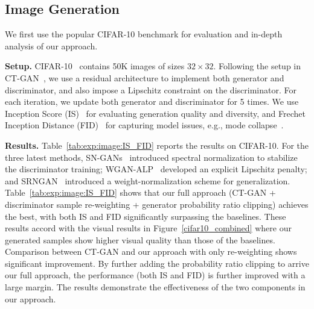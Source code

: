 \documentclass{article}
\newcommand{\0}{\bm{0}}
\begin{document}
\subsection{Image Generation}\label{sec:exp:image}
We first use the popular CIFAR-10 benchmark for evaluation and in-depth analysis of our approach.






\textbf{Setup.}  
CIFAR-10~\cite{cifar10} contains 50K images of sizes $32\times 32$. Following the setup in CT-GAN~\cite{wwgan}, 
we use a residual architecture to implement both generator and discriminator, and also impose a Lipschitz constraint on the discriminator. For each iteration, we update both generator and discriminator for 5 times. We use Inception Score (IS)~\cite{salimans2016improved} for evaluating generation quality and diversity, and Frechet Inception Distance (FID)~\cite{FID} for capturing model issues, e.g., mode collapse~\cite{xu2018empirical}. 












\textbf{Results.} Table~\ref{tab:exp:image:IS_FID} reports the results on CIFAR-10. 
For the three latest methods, SN-GANs~\cite{SNGAN} introduced spectral normalization to stabilize the discriminator training; WGAN-ALP~\cite{wganalp} developed an explicit Lipschitz penalty; and SRNGAN~\cite{srngan} introduced a weight-normalization scheme for generalization.
Table~\ref{tab:exp:image:IS_FID} shows that our full approach (CT-GAN + discriminator sample re-weighting + generator probability ratio clipping) achieves the best, with both IS and FID significantly surpassing the  baselines. These results accord with the visual results in Figure~\ref{cifar10_combined} where our generated samples show higher visual quality than those of the baselines. Comparison between CT-GAN and our approach with only re-weighting shows significant improvement. By further adding the probability ratio clipping to arrive our full approach, the performance (both IS and FID) is further improved with a large margin. The results demonstrate the effectiveness of the two components in our approach. 






 
\end{document}
